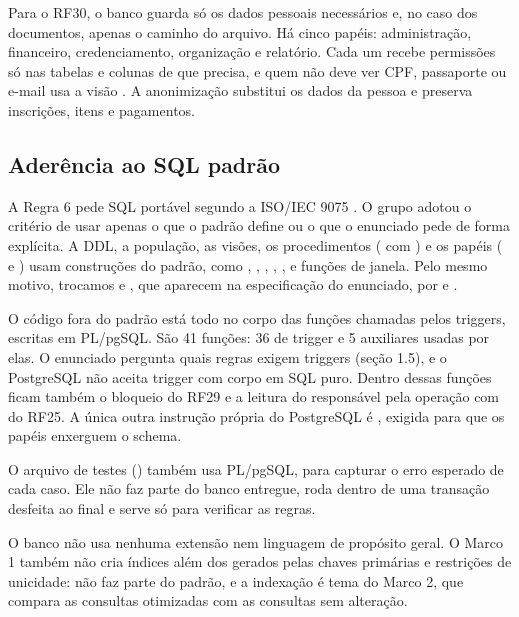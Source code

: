 Para o RF30, o banco guarda só os dados pessoais necessários e, no caso dos documentos, apenas o caminho do arquivo. Há cinco papéis: administração, financeiro, credenciamento, organização e relatório. Cada um recebe permissões só nas tabelas e colunas de que precisa, e quem não deve ver CPF, passaporte ou e-mail usa a visão . A anonimização substitui os dados da pessoa e preserva inscrições, itens e pagamentos.

\subsection{Aderência ao SQL padrão}
\label{sec:iso}

A Regra 6 pede SQL portável segundo a ISO/IEC 9075 \cite{iso9075}. O grupo adotou o critério de usar apenas o que o padrão define ou o que o enunciado pede de forma explícita. A DDL, a população, as visões, os procedimentos ( com ) e os papéis ( e ) usam construções do padrão, como , , , , ,  e funções de janela. Pelo mesmo motivo, trocamos  e , que aparecem na especificação do enunciado, por  e .

O código fora do padrão está todo no corpo das funções chamadas pelos triggers, escritas em PL/pgSQL. São 41 funções: 36 de trigger e 5 auxiliares usadas por elas. O enunciado pergunta quais regras exigem triggers (seção 1.5), e o PostgreSQL não aceita trigger com corpo em SQL puro. Dentro dessas funções ficam também o bloqueio  do RF29 e a leitura do responsável pela operação com  do RF25. A única outra instrução própria do PostgreSQL é , exigida para que os papéis enxerguem o schema.

O arquivo de testes () também usa PL/pgSQL, para capturar o erro esperado de cada caso. Ele não faz parte do banco entregue, roda dentro de uma transação desfeita ao final e serve só para verificar as regras.

O banco não usa nenhuma extensão nem linguagem de propósito geral. O Marco 1 também não cria índices além dos gerados pelas chaves primárias e restrições de unicidade:  não faz parte do padrão, e a indexação é tema do Marco 2, que compara as consultas otimizadas com as consultas sem alteração.

